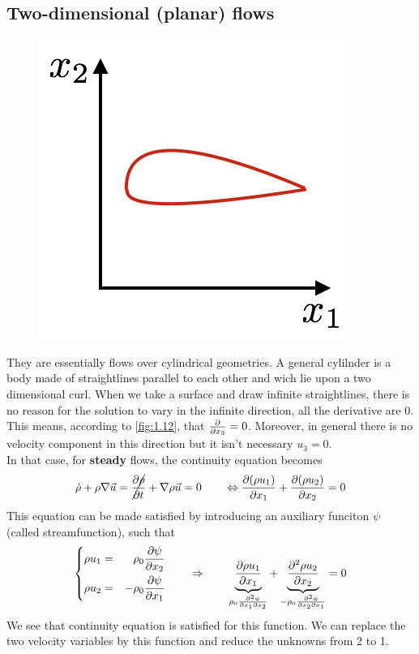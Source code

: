 	\subsection{Two-dimensional (planar) flows}
	
		\begin{figure}
		\vspace{-5mm}
		\includegraphics[scale=0.4]{ch1/12}
		\label{fig:1.12}
		\end{figure}
		They are essentially flows over cylindrical geometries. A general cylilnder is a body made of straightlines parallel to each other and wich lie upon a two dimensional curl. When we take a surface and draw infinite straightlines, there is no reason for the solution to vary in the infinite direction, all the derivative are 0. This means, according to \autoref{fig:1.12}, that $\frac{\partial}{\partial x_3}=0$. Moreover, in general there is no velocity component in this direction but it isn't necessary $u_3 = 0$.\\
		
		In that case, for \textbf{steady} flows, the continuity equation becomes 
		\begin{equation}
			\dot{\rho} + \rho \nabla \vec{u} = \cancel{\frac{\partial \rho}{\partial t}} + \nabla \rho \vec{u} = 0 \qquad \Leftrightarrow \frac{\partial (\rho u_1)}{\partial x_1} + \frac{\partial (\rho u_2)}{\partial x_2} = 0
		\end{equation}
		This equation can be made satisfied by introducing an auxiliary funciton $\psi$ (called streamfunction), such that  
		\begin{equation}
		\left\{
		\begin{aligned}
			\rho u_1 &= &\rho _0 \frac{\partial\psi}{\partial x_2}\\
			\rho u_2 &= &-\rho _0 \frac{\partial\psi}{\partial x_1}
		\end{aligned}
		\right.
		\qquad \Rightarrow \qquad \underbrace{\frac{\partial \rho u_1}{\partial x_1}}_{\rho _0 \frac{\partial ^2 \psi}{\partial x_1 \partial x_2}} + \underbrace{\frac{\partial ^2 \rho u_2}{\partial x_2}}_{-\rho _0 \frac{\partial ^2 \psi}{\partial x_2 \partial x_1}} = 0
		\label{eq:1.107}
		\end{equation}
		We see that continuity equation is satisfied for this function.  We can replace the two velocity variables by this function and reduce the unknowns from 2 to 1. 
		
